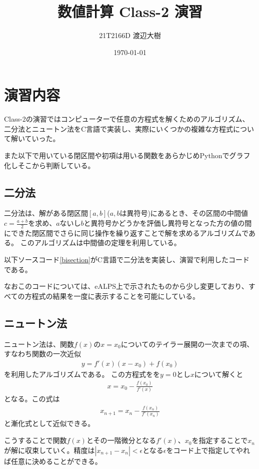 \documentclass[a4paper,11pt]{jsarticle}
\begin{document}
\title{数値計算 Class-2 演習}
\author{21T2166D 渡辺大樹}
\date{\today}
\maketitle
\section{演習内容}
Class-2の演習ではコンピューターで任意の方程式を解くためのアルゴリズム、二分法とニュートン法をC言語で実装し、実際にいくつかの複雑な方程式について解いていった。

また以下で用いている閉区間や初項は用いる関数をあらかじめPythonでグラフ化しそこから判断している。
    \subsection{二分法}
    二分法は、解がある閉区間$[a,b]$($a,b$は異符号)にあるとき、その区間の中間値$c=\frac{a+b}{2}$を求め、$a$ないし$b$と異符号かどうかを評価し異符号となった方の値の間にできた閉区間でさらに同じ操作を繰り返すことで解を求めるアルゴリズムである。
    このアルゴリズムは中間値の定理を利用している。
    
    以下ソースコード\ref{bisection}がC言語で二分法を実装し、演習で利用したコードである。
    

    なおこのコードについては、eALPS上で示されたものから少し変更しており、すべての方程式の結果を一度に表示することを可能にしている。

    \subsection{ニュートン法}
    ニュートン法は、関数$f(x)$の$x=x_0$についてのテイラー展開の一次までの項、すなわち関数の一次近似
    \begin{align*}
    y=f'(x)(x-x_0)+f(x_0)
    \end{align*}
    を利用したアルゴリズムである。
    この方程式をを$y=0$とし$x$について解くと
    \begin{align*}
    x = x_0-\frac{f(x_0)}{f'(x)}
    \end{align*}
    となる。この式は
    \begin{align*}
    x_{n+1} = x_n-\frac{f(x_n)}{f'(x_n)}
    \end{align*}
    と漸化式として近似できる。
    
    こうすることで関数$f(x)$とその一階微分となる$f'(x)$、$x_0$を指定することで$x_n$が解に収束していく。精度は$|x_{n+1}-x_n| < \epsilon$となる$\epsilon$をコード上で指定してやれば任意に決めることができる。
    
\end{document}
